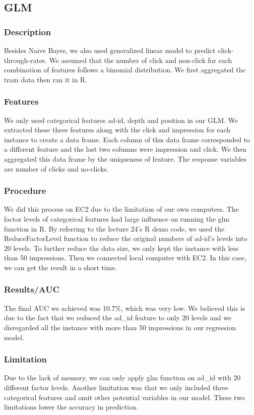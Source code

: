 \documentclass[12pt]{article}
\begin{document}
\subsection{GLM}
\subsubsection{Description}
Besides Naive Bayes, we also used generalized linear model to predict click-through-rates. We assumed that the number of click and non-click for each combination of features follows a binomial distribution. We first aggregated the train data then ran it in R. 
\subsubsection{Features}
We only used categorical features ad-id, depth and position in our GLM. We extracted these three features along with the click and impression for each instance to create a data frame. Each column of this data frame corresponded to a different feature and the last two columns were impression and click. We then aggregated this data frame by the uniqueness of feature. The response variables are number of clicks and no-clicks. 
\subsubsection{Procedure}
We did this process on EC2 due to the limitation of our own computers. The factor levels of categorical features had large influence on running the glm function in R. By referring to the lecture 24’s R demo code, we used the ReduceFactorLevel function to reduce the original numbers of ad-id’s levels into 20 levels. To further reduce the data size, we only kept the instance with less than 50 impressions. Then we connected local computer with EC2. In this case, we can get the result in a short time. 
\subsubsection{Results/AUC}
The final AUC we achieved was 10.7\%, which was very low. We believed this is due to the fact that we reduced the ad\_id feature to only 20 levels and we disregarded all the instance with more than 50 impressions in our regression model.
\subsubsection{Limitation}
Due to the lack of memory, we can only apply glm function on ad\_id with 20 different factor levels. Another limitation was that we only included three categorical features and omit other potential variables in our model. These two limitations lower the accuracy in prediction.
\end{document}

